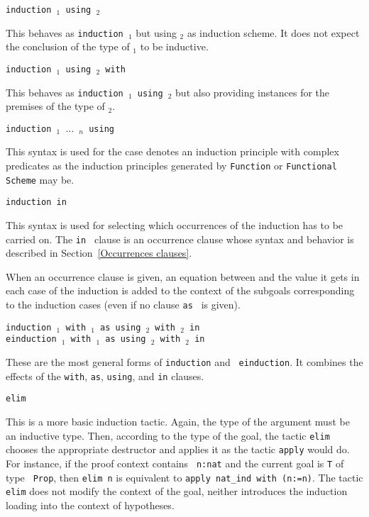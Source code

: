 \begin{Variants}
\item {\tt induction {\term$_1$} using {\term$_2$}}

  This behaves as {\tt induction {\term$_1$}} but using {\term$_2$} as
  induction scheme. It does not expect the conclusion of the type of
  {\term$_1$} to be inductive.

\item {\tt induction {\term$_1$} using {\term$_2$} with {\bindinglist}}

  This behaves as {\tt induction {\term$_1$} using {\term$_2$}} but
  also providing instances for the premises of the type of {\term$_2$}.

\item \texttt{induction {\term}$_1$ $\ldots$ {\term}$_n$ using {\qualid}}

  This syntax is used for the case {\qualid} denotes an induction principle
  with complex predicates as the induction principles generated by
  {\tt Function} or {\tt Functional Scheme} may be.

\item \texttt{induction {\term} in {\occgoalset}}

  This syntax is used for selecting which occurrences of {\term} the
  induction has to be carried on. The {\tt in {\atoccurrences}} clause is an
  occurrence clause whose syntax and behavior is described in
  Section~\ref{Occurrences clauses}.

  When an occurrence clause is given, an equation between {\term} and
  the value it gets in each case of the induction is added to the
  context of the subgoals corresponding to the induction cases (even
  if no clause {\tt as {\namingintropattern}} is given).

\item {\tt induction {\term$_1$} with {\bindinglist$_1$} as {\namingintropattern} {\disjconjintropattern} using {\term$_2$} with {\bindinglist$_2$} in {\occgoalset}}\\
     {\tt einduction {\term$_1$} with {\bindinglist$_1$} as {\namingintropattern} {\disjconjintropattern} using {\term$_2$} with {\bindinglist$_2$} in {\occgoalset}}

  These are the most general forms of {\tt induction} and {\tt
  einduction}.  It combines the effects of the {\tt with}, {\tt as},
  {\tt using}, and {\tt in} clauses.

\item {\tt elim \term}\label{elim}
  
  This is a more basic induction tactic.  Again, the type of the
  argument {\term} must be an inductive type. Then, according to
  the type of the goal, the tactic {\tt elim} chooses the appropriate
  destructor and applies it as the tactic {\tt apply}
  would do. For instance, if the proof context contains {\tt
  n:nat} and the current goal is {\tt T} of type {\tt
  Prop}, then {\tt elim n} is equivalent to {\tt apply nat\_ind with
  (n:=n)}.  The tactic {\tt elim} does not modify the context of
  the goal, neither introduces the induction loading into the context
  of hypotheses.


\end{Variants}
